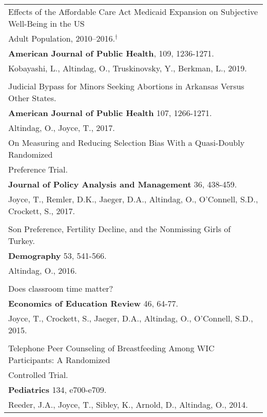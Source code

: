 \documentclass[12 pt]{article}
\begin{document}
\begin{longtable}{ccccc}
 \\ 

  \multicolumn{5}{l}{Effects of the Affordable Care Act Medicaid Expansion on Subjective Well-Being in the US} \\
    \multicolumn{5}{l}{Adult Population, 2010–2016.$^{\dagger}$} \\
   \multicolumn{5}{l}{\textbf{American Journal of Public Health}, 109, 1236-1271.} \\
   \multicolumn{5}{l}{Kobayashi, L., Altindag, O., Truskinovsky, Y., Berkman, L., 2019.}  \\

\\
   \multicolumn{5}{l}{Judicial Bypass for Minors Seeking Abortions in Arkansas Versus Other States.} \\
    \multicolumn{5}{l}{\textbf{American Journal of Public Health} 107, 1266-1271. 
} \\
    \multicolumn{5}{l}{Altindag, O., Joyce, T., 2017.}  \\
 
   \multicolumn{5}{l}{On Measuring and Reducing Selection Bias With a Quasi-Doubly Randomized} \\
      \multicolumn{5}{l}{Preference Trial.} \\
     \multicolumn{5}{l}{\textbf{Journal of Policy Analysis and Management} 36, 438-459. } \\
      \multicolumn{5}{l}{Joyce, T., Remler, D.K., Jaeger, D.A., Altindag, O., O'Connell, S.D., Crockett, S., 2017. } \\

\\

   \multicolumn{5}{l}{Son Preference, Fertility Decline, and the Nonmissing Girls of Turkey.} \\
     \multicolumn{5}{l}{\textbf{Demography}  53, 541-566. } \\
      \multicolumn{5}{l}{Altindag, O., 2016. } \\

\\
   \multicolumn{5}{l}{Does classroom time matter?} \\
     \multicolumn{5}{l}{\textbf{Economics of Education Review} 46, 64-77. } \\
      \multicolumn{5}{l}{Joyce, T., Crockett, S., Jaeger, D.A., Altindag, O., O'Connell, S.D., 2015.} \\

\\ \multicolumn{5}{l}{Telephone Peer Counseling of Breastfeeding Among WIC Participants: A Randomized} \\
      \multicolumn{5}{l}{ Controlled Trial.} \\
     \multicolumn{5}{l}{\textbf{Pediatrics} 134, e700-e709. } \\
      \multicolumn{5}{l}{Reeder, J.A., Joyce, T., Sibley, K., Arnold, D., Altindag, O., 2014. } \\



\end{longtable}
\end{document}
